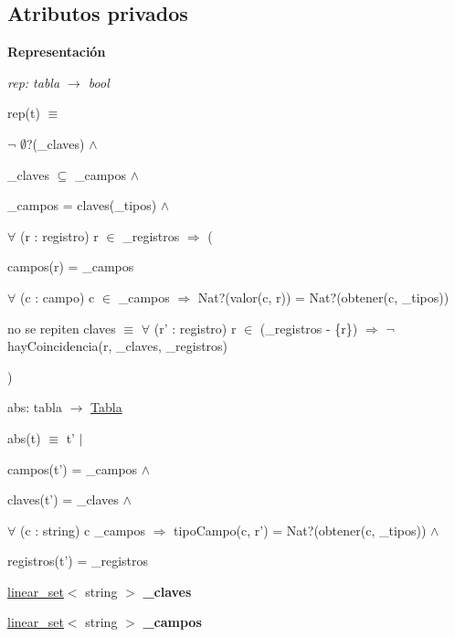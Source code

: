 \subsection*{Atributos privados}
\begin{Indent}{\bf Representación}\par
{\em rep\-: tabla $\to$ bool\par
rep(t) $\equiv$
\begin{DoxyItemize}
\item $\lnot$ $\emptyset$?(\-\_\-claves) $\land$
\item \-\_\-claves $\subseteq$ \-\_\-campos $\land$
\item \-\_\-campos = claves(\-\_\-tipos) $\land$
\item $\forall$ (r \-: registro) r $\in$ \-\_\-registros $\Rightarrow$ (
\begin{DoxyItemize}
\item campos(r) = \-\_\-campos
\item $\forall$ (c \-: campo) c $\in$ \-\_\-campos $\Rightarrow$ Nat?(valor(c, r)) = Nat?(obtener(c, \-\_\-tipos))
\item no se repiten claves $\equiv$ $\forall$ (r' \-: registro) r $\in$ (\-\_\-registros -\/ \{r\}) $\Rightarrow$ $\lnot$ hay\-Coincidencia(r, \-\_\-claves, \-\_\-registros)
\end{DoxyItemize}
\item )
\end{DoxyItemize}

abs\-: tabla $\to$ \hyperlink{classTabla}{Tabla}\par
abs(t) $\equiv$ t' $|$
\begin{DoxyItemize}
\item campos(t') = \-\_\-campos $\land$
\item claves(t') = \-\_\-claves $\land$
\item $\forall$ (c \-: string) c  \-\_\-campos $\Rightarrow$ tipo\-Campo(c, r') = Nat?(obtener(c, \-\_\-tipos)) $\land$
\item registros(t') = \-\_\-registros 
\end{DoxyItemize}}\begin{DoxyCompactItemize}
\item 
\hypertarget{classTabla_a3fc11c070caf35a44a23724a6a5bae92}{\hyperlink{classlinear__set}{linear\-\_\-set}$<$ string $>$ {\bfseries \-\_\-claves}}\label{classTabla_a3fc11c070caf35a44a23724a6a5bae92}

\item 
\hypertarget{classTabla_ac527baaf100aea820dd4d1687b0f2378}{\hyperlink{classlinear__set}{linear\-\_\-set}$<$ string $>$ {\bfseries \-\_\-campos}}\label{classTabla_ac527baaf100aea820dd4d1687b0f2378}


\end{DoxyCompactItemize}
\end{Indent}
